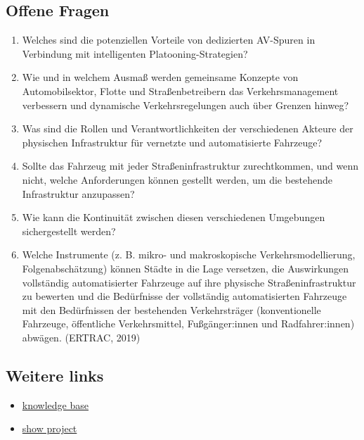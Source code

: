 \documentclass[
]{book}
\providecommand{\tightlist}{%
  \setlength{\itemsep}{0pt}\setlength{\parskip}{0pt}}
\begin{document}
\hypertarget{offene-fragen}{%
\subsection*{Offene Fragen}\label{offene-fragen}}

\begin{enumerate}
\def\labelenumi{\arabic{enumi}.}
\tightlist
\item
  Welches sind die potenziellen Vorteile von dedizierten AV-Spuren in Verbindung mit intelligenten Platooning-Strategien?
\item
  Wie und in welchem Ausmaß werden gemeinsame Konzepte von Automobilsektor, Flotte und Straßenbetreibern das Verkehrsmanagement verbessern und dynamische Verkehrsregelungen auch über Grenzen hinweg?
\item
  Was sind die Rollen und Verantwortlichkeiten der verschiedenen Akteure der physischen Infrastruktur für vernetzte und automatisierte Fahrzeuge?
\item
  Sollte das Fahrzeug mit jeder Straßeninfrastruktur zurechtkommen, und wenn nicht, welche Anforderungen können gestellt werden, um die bestehende Infrastruktur anzupassen?
\item
  Wie kann die Kontinuität zwischen diesen verschiedenen Umgebungen sichergestellt werden?
\item
  Welche Instrumente (z. B. mikro- und makroskopische Verkehrsmodellierung, Folgenabschätzung) können Städte in die Lage versetzen, die Auswirkungen vollständig automatisierter Fahrzeuge auf ihre physische Straßeninfrastruktur zu bewerten und
  die Bedürfnisse der vollständig automatisierten Fahrzeuge mit den Bedürfnissen der bestehenden Verkehrsträger (konventionelle Fahrzeuge, öffentliche Verkehrsmittel, Fußgänger:innen und Radfahrer:innen) abwägen. (ERTRAC, 2019)
\end{enumerate}

\hypertarget{weitere-links}{%
\subsection*{Weitere links}\label{weitere-links}}

\begin{itemize}
\tightlist
\item
  \href{https://knowledge-base.connectedautomateddriving.eu/wp-content/uploads/2019/12/SMART_2010-0064-study-report-final_V1-2.pdf}{knowledge base}
\item
  \href{https://show-project.eu/}{show project}
\end{itemize}
\end{document}
